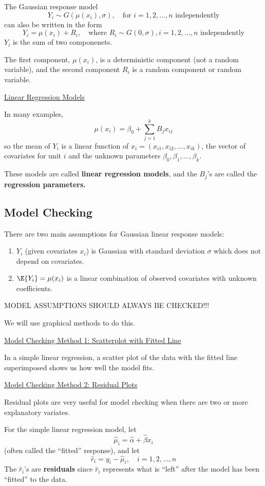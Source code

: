 The Gaussian response model
\[Y_{i} \sim G\left(\mu\left(x_{i}\right), \sigma\right), \quad \text{for } i=1,2, \ldots, n \text{ independently}\]
can also be written in the form
\[Y_{i}=\mu\left(x_{i}\right)+R_{i}, \quad \text{where } R_{i} \sim G(0, \sigma), i=1,2, \ldots, n \text{ independently}\]
$ Y_i $ is the sum of two componenets.

The first component, $ \mu(x_i) $, is a deterministic component (not a random variable),
and the second component $ R_i $ is a random component or random variable.

\underline{Linear Regression Models}

In many examples,
\[ \mu(x_i)=\beta_0+\sum\limits_{j=1}^{k} B_j x_{ij} \]
so the mean of $ Y_i $ is a linear function of $ x_i=(x_{i1},x_{i2},\ldots ,x_{ik}) $,
the vector of covariates for unit $ i $ and the unknown parameters $ \beta_0,\beta_1,\ldots ,\beta_k $.

These models are called \textbf{linear regression models}, and the $ B_j $'s are called the
\textbf{regression parameters.}

\subsection{Model Checking}
There are two main assumptions for Gaussian linear response models:
\begin{enumerate}
    \item $ Y_i $ (given covariates $ x_i $) is Gaussian with standard deviation $ \sigma $
          which does not depend on covariates.
    \item $ \E{Y_i}=\mu(x_i) $ is a linear combination of observed covariates with
          unknown coefficients.
\end{enumerate}
\begin{center}
    MODEL ASSUMPTIONS SHOULD ALWAYS BE CHECKED!!!
\end{center}
We will use graphical methods to do this.

\underline{Model Checking Method 1: Scatterplot with Fitted Line}

In a simple linear regression, a scatter plot of the data with the fitted line superimposed
shows us how well the model fits.

\underline{Model Checking Method 2: Residual Plots}

Residual plots are very useful for model checking when there are two or more explanatory
variates.

\begin{Definition}{}{}
    For the simple linear regression model, let
    \[ \hat{\mu}_i=\hat{\alpha}+\hat{\beta}x_i \]
    (often called the ``fitted'' response), and let
    \[ \hat{r}_i=y_i-\hat{\mu}_i,\quad i=1,2,\ldots ,n \]
    The $ \hat{r}_i $'s are \textbf{residuals} since $ \hat{r}_i $ represents
    what is ``left'' after the model has been ``fitted'' to the data.
\end{Definition}

